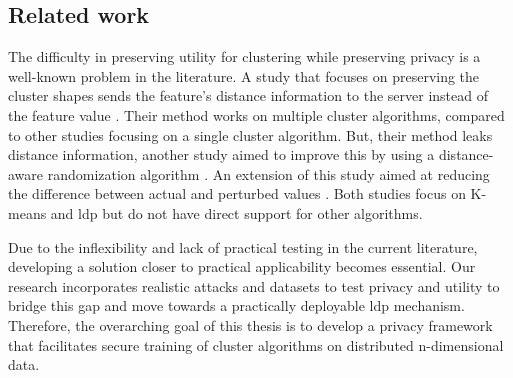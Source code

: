 \newpage

\subsection*{Related work}
The difficulty in preserving utility for clustering while preserving privacy is a well-known problem in the literature.
A study that focuses on preserving the cluster shapes sends the feature’s distance information to the server instead of the feature value \citep{sun_distributed_2019}.
Their method works on multiple cluster algorithms, compared to other studies focusing on a single cluster algorithm.
But, their method leaks distance information, another study aimed to improve this by using a distance-aware randomization algorithm \cite{xia_distributed_2020}.
An extension of this study aimed at reducing the difference between actual and perturbed values \citep{9679364}.
Both studies focus on K-means and \gls{ldp} but do not have direct support for other algorithms. \newline

Due to the inflexibility and lack of practical testing in the current literature, developing a solution closer to practical applicability becomes essential.
Our research incorporates realistic attacks and datasets to test privacy and utility to bridge this gap and move towards a practically deployable \gls{ldp} mechanism.
Therefore, the overarching goal of this thesis is to develop a privacy framework that facilitates secure training of cluster algorithms on distributed n-dimensional data.


